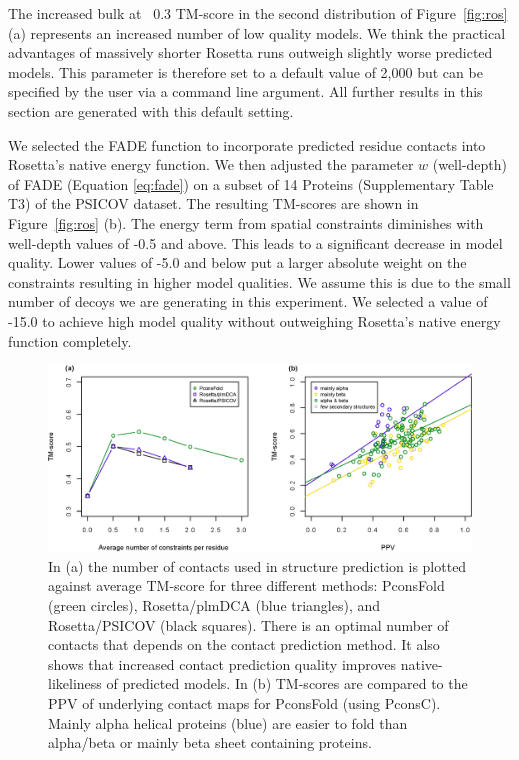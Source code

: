 \documentclass{bioinfo}
\begin{document}
The increased bulk at ~0.3 TM-score in the second
distribution of Figure~\ref{fig:ros} (a) represents an increased
number of low quality models. We think the practical advantages of
massively shorter Rosetta runs outweigh slightly worse predicted
models. This parameter is therefore set to a default value of 2,000
but can be specified by the user via a command line argument. All
further results in this section are generated with this default
setting. 


We selected the FADE function to incorporate predicted residue
contacts into Rosetta's native energy function. We then adjusted the
parameter $w$ (well-depth) of FADE (Equation \ref{eq:fade}) on a
subset of 14 Proteins (Supplementary Table T3) of the PSICOV
dataset. The resulting TM-scores are shown in Figure~\ref{fig:ros}
(b). The energy term from spatial constraints diminishes with
well-depth values of -0.5 and above. This leads to a significant
decrease in model quality. Lower values of -5.0 and below put a larger
absolute weight on the constraints resulting in higher model
qualities. We assume this is due to the small number of decoys we are
generating in this experiment. We selected a value of -15.0 to achieve
high model quality without outweighing Rosetta's native energy
function completely.


\begin{figure}[!tpb]%
\centerline{\includegraphics[scale=0.7]{figures/tmscores.eps}}
\caption{In (a) the number of contacts used in structure prediction is plotted against average TM-score for three different methods: PconsFold (green circles), Rosetta/plmDCA (blue triangles), and Rosetta/PSICOV (black squares). There is an optimal number of contacts that depends on the contact prediction method. It also shows that increased contact prediction quality improves native-likeliness of predicted models. In (b) TM-scores are compared to the PPV of underlying contact maps for PconsFold (using PconsC). Mainly alpha helical proteins (blue) are easier to fold than alpha/beta or mainly beta sheet containing proteins.}\label{fig:main}
\end{figure}
\end{document}
